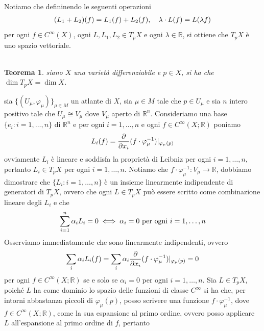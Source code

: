 \documentclass[oneside, 11pt]{amsbook}
\makeatletter
\newcommand{\0}{{(0)}}
\newcommand{\3}{{(3)}}
\theoremstyle{colonplain}
\newtheorem{thm}{Teorema}[chapter]
\theoremstyle{colondefinition}
\theoremstyle{colonremark}
\numberwithin{equation}{chapter}
\renewcommand{\proofname}{Dimostrazione}
\renewenvironment{proof}[1][\proofname]{\par
  \pushQED{\qed}%
  \normalfont \topsep6\p@\@plus6\p@\relax
  \trivlist
  \item[\hskip\labelsep\bfseries #1:]\ignorespaces
}{%
  \popQED\endtrivlist\@endpefalse
}
\makeatother
\begin{document}
Notiamo che defininendo le seguenti operazioni
\begin{align}
    (L_1 + L_2)(f) = L_1(f) + L_2(f), \quad \lambda \cdot L(f) = L(\lambda f) \notag
\end{align}
per ogni $f \in C^{\infty}(X)$, ogni $L, L_1, L_2 \in T_pX$ e ogni $\lambda \in \mathbb{R}$, si ottiene che $T_pX$ è uno spazio vettoriale. \\ \\
\begin{thm} siano $X$ una varietà differenziabile e $p \in X$, si ha che $\dim T_pX = \dim X$. \\
\end{thm}

\begin{proof} sia $\{ (U_\mu, \varphi_\mu) \}_{\mu \in M}$ un atlante di $X$, sia $\mu \in M$ tale che $p \in U_\mu$ e sia $n$ intero positivo tale che $U_\mu \cong V_\mu$ dove $V_\mu$ aperto di $\mathbb{R}^n$. Consideriamo una base $\{ e_i : i = 1, \dots, n \}$ di $\mathbb{R}^n$ e per ogni $i = 1, \dots, n$ e ogni $f \in C^{\infty}(X; \mathbb{R})$ poniamo
\begin{align}
    L_i(f) = \frac{\partial}{ \partial x_i}(f \cdot \varphi^{-1}_\mu)|_{\varphi_\mu(p)} \notag
\end{align}
ovviamente $L_i$ è lineare e soddisfa la proprietà di Leibniz per ogni $i = 1, \dots, n$, pertanto $L_i \in T_p X$ per ogni $i = 1, \dots, n$. Notiamo che $f \cdot \varphi^{-1}_\mu : V_\mu \longrightarrow \mathbb{R}$, dobbiamo dimostrare che $\{ L_i : i = 1, \dots, n \}$ è un insieme linearmente indipendente di generatori di $T_p X$, ovvero che ogni $L \in T_p X$ può essere scritto come combinazione lineare degli $L_i$ e che
\begin{align}
    \sum_{i = 1}^n \alpha_i L_i = 0 \iff \alpha_i = 0 \text{ per ogni } i = 1, \dots, n \notag
\end{align}
Osserviamo immediatamente che sono linearmente indipendenti, ovvero
\begin{align}
    \sum_i \alpha_i L_i(f) = \sum_i \alpha_i \frac{\partial}{\partial x_i}(f \cdot \varphi^{-1}_\mu)|_{\varphi_\mu(p)} = 0 \notag
\end{align}
per ogni $f \in C^{\infty}(X; \mathbb{R})$ se e solo se $\alpha_i = 0$ per ogni $i = 1, \dots, n$. Sia $L \in T_p X$, poiché $L$ ha come dominio lo spazio delle funzioni di classe $C^{\infty}$ si ha che, per intorni abbastanza piccoli di $\varphi_\mu(p)$, posso scrivere una funzione $f \cdot \varphi^{-1}_\mu$, dove $f \in C^{\infty}(X; \mathbb{R})$, come la sua espansione al primo ordine, ovvero posso applicare $L$ all'espansione al primo ordine di $f$, pertanto

\end{proof}
\end{document}
